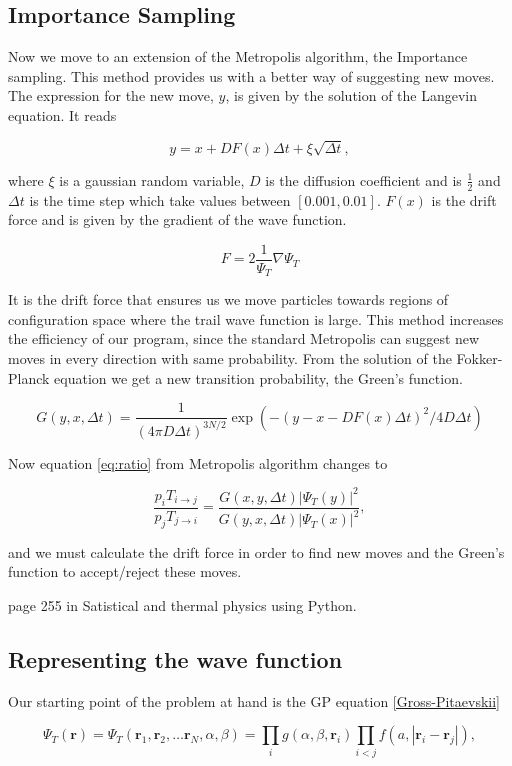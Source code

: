 \subsection{Importance Sampling}

Now we move to an extension of the Metropolis algorithm, the Importance sampling. This method provides us with a better way of suggesting new moves. The expression for the new move, $y$, is given by the solution of the Langevin equation. It reads 

$$y = x + D F(x) \Delta t + \xi \sqrt{\Delta t},$$

where $\xi$ is a gaussian random variable, $D$ is the diffusion coefficient and is $\frac{1}{2}$ and $\Delta t$ is the time step which take values between $[0.001, 0.01]$.
$F(x)$ is the drift force and is given by the gradient of the wave function. 

$$F = 2 \frac{1}{\Psi_T} \nabla \Psi_T$$

It is the drift force that ensures us we move particles towards regions of configuration space where the trail wave function is large. This method increases the efficiency of our program, since the standard Metropolis can suggest new moves in every direction with same probability. 
From the solution of the Fokker-Planck equation we get a new transition probability, the Green's function. 

$$G(y, x, \Delta t) = \frac{1}{(4 \pi D \Delta t)^{3N/2}} \exp (-(y - x - D F(x) \Delta t)^2/4 D \Delta t)$$

Now equation \ref{eq:ratio} from Metropolis algorithm changes to 

$$\frac{p_i T_{i \rightarrow j}}{p_j T_{j \rightarrow i}} = \frac{G(x, y, \Delta t)|\Psi_T(y)|^2}{G(y, x, \Delta t)|\Psi_T(x)|^2},$$

and we must calculate the drift force in order to find new moves and the Green's function to accept/reject these moves.

page 255 in Satistical and thermal physics using Python.

\subsection{Representing the wave function}

Our starting point of the problem at hand is the GP equation \ref{Gross-Pitaevskii}

\begin{equation} \label{eq:trialwf}
 \Psi_T(\mathbf{r})=\Psi_T(\mathbf{r}_1, \mathbf{r}_2, \dots \mathbf{r}_N,\alpha,\beta)=\prod_i g(\alpha,\beta,\mathbf{r}_i)\prod_{i < j}f(a,|\mathbf{r}_i-\mathbf{r}_j|),
\end{equation}

